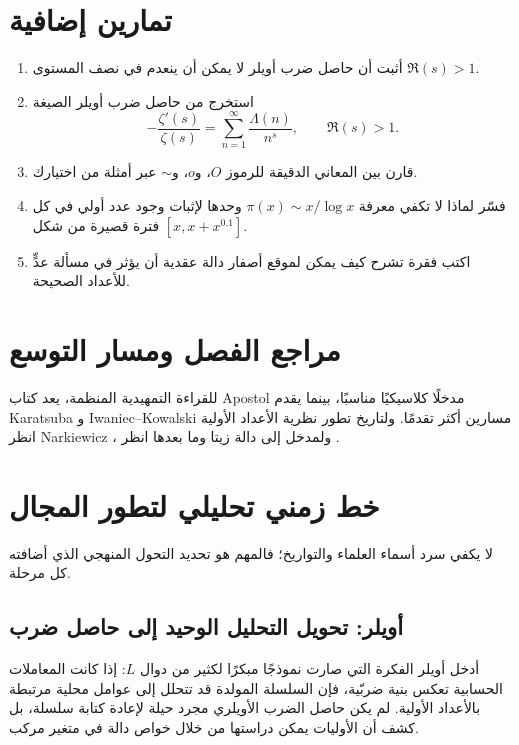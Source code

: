 \section{تمارين إضافية}

\begin{enumerate}
  \item أثبت أن حاصل ضرب أويلر لا يمكن أن ينعدم في نصف المستوى \(\Re(s)>1\).
  \item استخرج من حاصل ضرب أويلر الصيغة
  \[
  -\frac{\zeta'(s)}{\zeta(s)}
  =\sum_{n=1}^{\infty}\frac{\Lambda(n)}{n^s},
  \qquad \Re(s)>1.
  \]
  \item قارن بين المعاني الدقيقة للرموز \(O\)، و\(o\)، و\(\sim\) عبر أمثلة من اختيارك.
  \item فسّر لماذا لا تكفي معرفة \(\pi(x)\sim x/\log x\) وحدها لإثبات وجود عدد أولي في كل فترة قصيرة من شكل \([x,x+x^{0.1}]\).
  \item اكتب فقرة تشرح كيف يمكن لموقع أصفار دالة عقدية أن يؤثر في مسألة عدٍّ للأعداد الصحيحة.
\end{enumerate}

\section{مراجع الفصل ومسار التوسع}

للقراءة التمهيدية المنظمة، يعد كتاب Apostol \cite{Apostol1976} مدخلًا
كلاسيكيًا مناسبًا، بينما يقدم Karatsuba \cite{Karatsuba1992} و
Iwaniec--Kowalski \cite{IwaniecKowalski2004} مسارين أكثر تقدمًا. ولتاريخ
تطور نظرية الأعداد الأولية انظر Narkiewicz \cite{Narkiewicz2000}، ولمدخل
إلى دالة زيتا وما بعدها انظر \cite{Titchmarsh1986,GelbartMiller2003}.


\section{خط زمني تحليلي لتطور المجال}

لا يكفي سرد أسماء العلماء والتواريخ؛ فالمهم هو تحديد التحول المنهجي الذي أضافته كل مرحلة.

\subsection{أويلر: تحويل التحليل الوحيد إلى حاصل ضرب}

أدخل أويلر الفكرة التي صارت نموذجًا مبكرًا لكثير من دوال \(L\): إذا كانت المعاملات الحسابية تعكس بنية ضربّية، فإن السلسلة المولدة قد تتحلل إلى عوامل محلية مرتبطة بالأعداد الأولية. لم يكن حاصل الضرب الأويلري مجرد حيلة لإعادة كتابة سلسلة، بل كشف أن الأوليات يمكن دراستها من خلال خواص دالة في متغير مركب.


